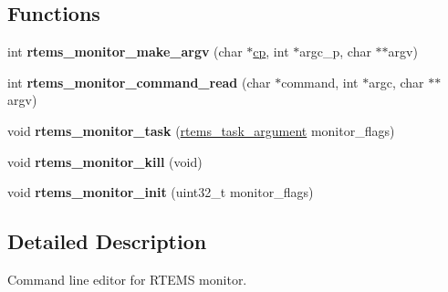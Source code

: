 \subsection*{Functions}
\begin{DoxyCompactItemize}
\item 
\mbox{\label{mon-editor_8c_a3e6bea72b3f9baa53dfaeabbd7dd06d1}} 
int {\bfseries rtems\+\_\+monitor\+\_\+make\+\_\+argv} (char $\ast$\mbox{\hyperlink{sun4u_2tte_8h_a7c4d12da78e9da48a4a9ad36b62d3232}{cp}}, int $\ast$argc\+\_\+p, char $\ast$$\ast$argv)
\item 
\mbox{\label{mon-editor_8c_a4737077a440da29c94a33971882bffca}} 
int {\bfseries rtems\+\_\+monitor\+\_\+command\+\_\+read} (char $\ast$command, int $\ast$argc, char $\ast$$\ast$argv)
\item 
\mbox{\label{mon-editor_8c_ad8acb032203e41815aa2894e82875e54}} 
void {\bfseries rtems\+\_\+monitor\+\_\+task} (\mbox{\hyperlink{group__ClassicTasks_gaf202f985ef5a3156f29eae99a0536842}{rtems\+\_\+task\+\_\+argument}} monitor\+\_\+flags)
\item 
\mbox{\label{mon-editor_8c_a503b370b65a466e1f3b8ac2340707fbd}} 
void {\bfseries rtems\+\_\+monitor\+\_\+kill} (void)
\item 
\mbox{\label{mon-editor_8c_a814628b630b2e2579b32ea1ee7216e4c}} 
void {\bfseries rtems\+\_\+monitor\+\_\+init} (uint32\+\_\+t monitor\+\_\+flags)
\end{DoxyCompactItemize}


\subsection{Detailed Description}
Command line editor for R\+T\+E\+MS monitor. 

